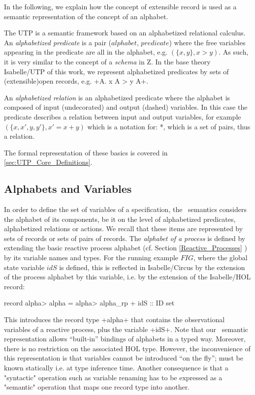 \documentclass[11pt,a4paper]{article}
\begin{document}
In the following, we explain how the concept of
extensible record is used as a semantic representation
of the concept of an alphabet.

The UTP is a semantic framework based on an alphabetized relational
calculus. An \emph{alphabetized predicate} is a pair ($alphabet$,
$predicate$) where the free variables appearing in the predicate are
all in the alphabet, e.g. $(\{x, y\}, x > y)$. As such, it is very similar to
the concept of a \emph{schema} in Z. In the base theory Isabelle/UTP
of this work, we represent alphabetized predicates  by sets of (extensible)open 
records, e.g.  \inlineisar+{A. x A > y A}+.


An \emph{alphabetized relation} is an alphabetized predicate where the
alphabet is composed of input (undecorated) and output (dashed)
variables. In this case the predicate describes a relation between
input and output variables, for example $(\{x, x', y, y'\}, x' = x + y)$
which is a notation for: *, which is
a set of pairs, thus a relation.

The formal representation of these basics is covered in \ref{sec:UTP_Core_Definitions}.

\subsection{Alphabets and Variables}
%
In order to define the set of variables of a specification, the \Circus\  semantics  
considers the alphabet of its components, 
be it on the level of alphabetized predicates, alphabetized relations or actions. 
We recall that
these items are represented by sets of records or sets of pairs of records. 
The \emph{alphabet of a process} is defined by extending the basic reactive process 
alphabet (cf. Section \ref{Reactive_Processes} ) by its variable names and types. 
For the running example $FIG$, where the global state variable $idS$ is defined, this is
reflected in Isabelle/Circus by the extension of the process alphabet by this variable, i.e. 
by the extension of the Isabelle/HOL record:
\begin{isar}
record \<alpha>  alpha = \<alpha>  alpha_rp +   idS :: ID set
\end{isar}
This introduces the record type \inlineisar+alpha+ that contains the observational variables 
of a reactive process, plus the variable \inlineisar+idS+. Note that  our \Circus\ semantic 
representation allows  ``built-in'' bindings of alphabets in a typed way. 
Moreover, there is no restriction on the associated HOL type. However, the inconvenience of this 
representation is that variables cannot be introduced ``on the fly''; must be known statically i.e. at 
type inference time. Another consequence is that a "syntactic" operation such as variable renaming 
has to be expressed as a "semantic" operation that maps one record type into another.
\end{document}
